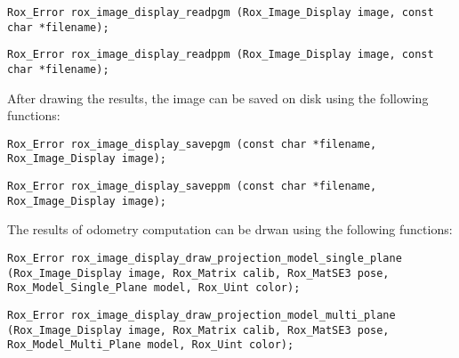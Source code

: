 \begin{lstlisting}
Rox_Error rox_image_display_readpgm (Rox_Image_Display image, const char *filename);
\end{lstlisting}

\begin{lstlisting}
Rox_Error rox_image_display_readppm (Rox_Image_Display image, const char *filename);
\end{lstlisting}

After drawing the results, the image can be saved on disk using the following functions:

\begin{lstlisting}
Rox_Error rox_image_display_savepgm (const char *filename, Rox_Image_Display image);
\end{lstlisting}

\begin{lstlisting}
Rox_Error rox_image_display_saveppm (const char *filename, Rox_Image_Display image);
\end{lstlisting}

The results of odometry computation can be drwan using the following functions:
\begin{lstlisting}
Rox_Error rox_image_display_draw_projection_model_single_plane (Rox_Image_Display image, Rox_Matrix calib, Rox_MatSE3 pose, Rox_Model_Single_Plane model, Rox_Uint color);
\end{lstlisting}

\begin{lstlisting}
Rox_Error rox_image_display_draw_projection_model_multi_plane (Rox_Image_Display image, Rox_Matrix calib, Rox_MatSE3 pose, Rox_Model_Multi_Plane model, Rox_Uint color);
\end{lstlisting}
